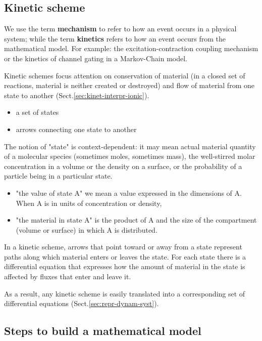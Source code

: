 \subsection{Kinetic scheme}
\label{sec:kinetic-scheme}


\begin{framed}
  We use the term {\bf mechanism} to refer to how an event occurs in a
  physical system; while the term {\bf kinetics} refers to how an event occurs
  from the mathematical model. For example: the excitation-contraction coupling
  mechanism or the kinetics of channel gating in a Markov-Chain model.
\end{framed}

Kinetic schemes focus attention on conservation of material (in a closed set of
reactions, material is neither created or destroyed) and flow of material from
one state to another (Sect.\ref{sec:kinet-interpr-ionic}).
\begin{itemize}
  \item a set of states
  
  \item arrows connecting one state to another
\end{itemize}

The notion of "state" is context-dependent: it may mean actual material quantity
of a molecular species (sometimes moles, sometimes mass), the well-stirred molar
concentration in a volume or the density on a surface, or the probability of a
particle being in a particular state.
\begin{itemize}
  \item  "the value of state A" we mean a value expressed in the dimensions of
  A. When A is in units of concentration or density,

  \item "the material in state A" is the product of A and the size of the
  compartment (volume or surface) in which A is distributed.
\end{itemize}

In a kinetic scheme, arrows that point toward or away from a state represent
paths along which material enters or leaves the state.
For each state there is a differential equation that expresses how the amount of
material in the state is affected by fluxes that enter and leave it.

As a result, any kinetic scheme is easily translated into a corresponding set of
differential equations (Sect.\ref{sec:repr-dynam-syst}). 


\subsection{Steps to build a mathematical model}
\label{sec:mathematical-biology}


